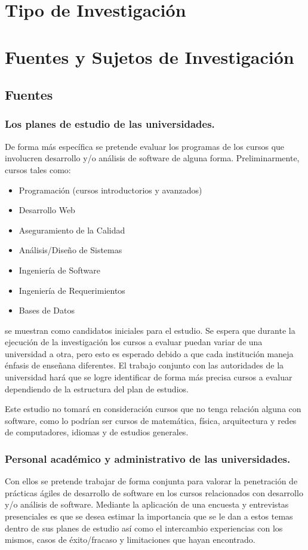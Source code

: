 \section{Tipo de Investigación}

\section{Fuentes y Sujetos de Investigación}

\subsection{Fuentes}

\subsubsection{Los planes de estudio de las universidades.} De forma más específica se pretende evaluar los programas de los cursos que involucren desarrollo y/o análisis de software de alguna forma. Preliminarmente, cursos tales como:
\begin{itemize}
    \item Programación (cursos introductorios y avanzados)
    \item Desarrollo Web
    \item Aseguramiento de la Calidad
    \item Análisis/Diseño de Sistemas
    \item Ingeniería de Software
    \item Ingeniería de Requerimientos
    \item Bases de Datos
\end{itemize}

se muestran como candidatos iniciales para el estudio. Se espera que durante la ejecución de la investigación los cursos a evaluar puedan variar de una universidad a otra, pero esto es esperado debido a que cada institución maneja énfasis de enseñana diferentes. El trabajo conjunto con las autoridades de la universidad hará que se logre identificar de forma más precisa cursos a evaluar dependiendo de la estructura del plan de estudios.

Este estudio no tomará en consideración cursos que no tenga relación alguna con software, como lo podrían ser cursos de matemática, física, arquitectura y redes de computadores, idiomas y de estudios generales.

\subsubsection{Personal académico y administrativo de las universidades.} 
Con ellos se pretende trabajar de forma conjunta para valorar la penetración de prácticas ágiles de desarrollo de software en los cursos relacionados con desarrollo y/o análisis de software. Mediante la aplicación de una encuesta y entrevistas presenciales es que se desea estimar la importancia que se le dan a estos temas dentro de sus planes de estudio así como el intercambio experiencias con los mismos, casos de éxito/fracaso y limitaciones que hayan encontrado.

